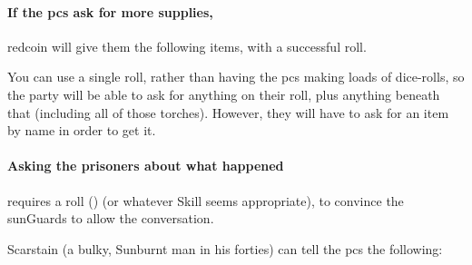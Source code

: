 \begin{multicols}{2}

\paragraph{If the \glspl{pc} ask for more supplies,}
\gls{redcoin} will give them the following items, with a successful  roll.

You can use a single roll, rather than having the \glspl{pc} making loads of dice-rolls, so the party will be able to ask for anything on their roll, plus anything beneath that  (including all of those torches).
However, they will have to ask for an item by name in order to get it.

\paragraph{Asking the prisoners about what happened}
requires a  roll (\tn[8]) (or whatever Skill seems appropriate), to convince the \glspl{sunGuard} to allow the conversation.

Scarstain (a bulky, Sunburnt man in his forties) can tell the \glspl{pc} the following:


\end{multicols}

